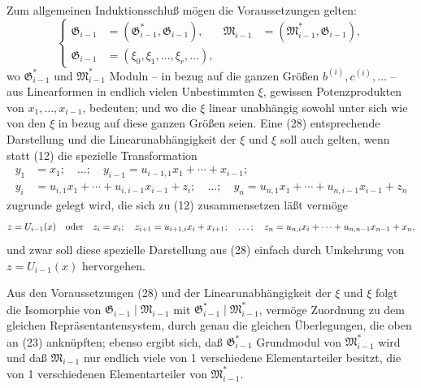 \documentclass[11pt]{article}
\providecommand{\Gmod}{\mathfrak G}
\providecommand{\Mmod}{\mathfrak M}
\begin{document}
Zum allgemeinen Induktionsschluß mögen die Voraussetzungen gelten:
\begin{equation}
\left\{\begin{aligned}
 \Gmod_{i-1}&=(\Gmod_{i-1}^*,\Gmod_{i-1}),&
 \Mmod_{i-1}&=(\Mmod_{i-1}^*,\Gmod_{i-1}),\\
 \Gmod_{i-1}&=(\xi_0,\xi_1,\ldots,\xi_r,\ldots),
\end{aligned}\right.
\tag{28}
\end{equation}
wo $\Gmod^*_{i-1}$ und $\Mmod^*_{i-1}$ Moduln -- in bezug auf die ganzen Größen $b^{(i)},c^{(i)},\ldots$ -- aus Linearformen in endlich vielen Unbestimmten $\xi$, gewissen Potenzprodukten von $x_1,\ldots,x_{i-1}$, bedeuten; und wo die $\xi$ linear unabhängig sowohl unter sich wie von den $\xi$ in bezug auf diese ganzen Größen seien. Eine (28) entsprechende Darstellung und die Linearunabhängigkeit der $\xi$ und $\xi$ soll auch gelten, wenn statt (12) die spezielle Transformation
\begin{equation}
\begin{aligned}
 y_1&=x_1;\quad \ldots;\quad y_{i-1}=u_{i-1,1}x_1+\cdots+x_{i-1};\\
 y_i&=u_{i,1}x_1+\cdots+u_{i,i-1}x_{i-1}+z_i;\quad\ldots;\quad
 y_n=u_{n,1}x_1+\cdots+u_{n,i-1}x_{i-1}+z_n
\end{aligned}
\tag{29}
\end{equation}
zugrunde gelegt wird, die sich zu (12) zusammensetzen läßt vermöge
\[
 z=U_{i-1}(x)\quad\hbox{oder}\quad
 z_i=x_i;\quad z_{i+1}=u_{i+1,i}x_i+x_{i+1};\quad\ldots;\quad
 z_n=u_{n,i}x_i+\cdots+u_{n,n-1}x_{n-1}+x_n,
\]
und zwar soll diese spezielle Darstellung aus (28) einfach durch Umkehrung von $z=U_{i-1}(x)$ hervorgehen.

Aus den Voraussetzungen (28) und der Linearunabhängigkeit der $\xi$ und $\xi$ folgt die Isomorphie von $\Gmod_{i-1}\mid\Mmod_{i-1}$ mit $\Gmod^*_{i-1}\mid\Mmod^*_{i-1}$, vermöge Zuordnung zu dem gleichen Repräsentantensystem, durch genau die gleichen Überlegungen, die oben an (23) anknüpften; ebenso ergibt sich, daß $\Gmod^*_{i-1}$ Grundmodul von $\Mmod^*_{i-1}$ wird und daß $\Mmod_{i-1}$ nur endlich viele von 1 verschiedene Elementarteiler besitzt, die von 1 verschiedenen Elementarteiler von $\Mmod^*_{i-1}$.
\end{document}
